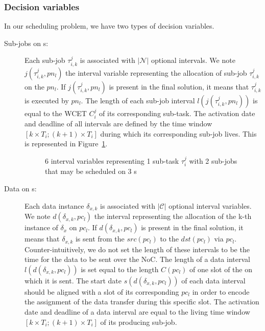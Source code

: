 \documentclass[main.tex]{subfiles}
\begin{document}
\subsubsection{Decision variables}
\label{sssec_validation_decisionVariables}
In our scheduling problem, we have two types of decision variables. 
\begin{description}
    \item[Sub-jobs on \PN{}s:] Each sub-job $\tau_{i,k}^j$ is associated with
        $|\mathcal{N}|$ optional intervals. We note $j(\tau_{i,k}^j , pn_l)$
        the interval variable representing the allocation of sub-job
        $\tau_{i,k}^j$ on the \PN{} $pn_l$. If $j(\tau_{i,k}^j , pn_l)$ is
        present in the final solution, it means that $\tau_{i,k}^j$ is executed
        by \PN{} $pn_l$. The length of each sub-job interval $l(j(\tau_{i,k}^j
        , pn_l))$ is equal to the WCET $C_i^j$ of its corresponding sub-task.
        The activation date and deadline of all intervals are defined by the
        time window $[k \times T_i ; (k+1) \times T_i ]$ during which its
        corresponding sub-job lives. This is represented in
        Figure~\ref{fig_validation_decVarJobs}.

        \begin{figure}
            \centering
            \scalebox{0.9}{}
            \caption{6 interval variables representing 1 sub-task $\tau_i^j$ with 2 sub-jobs that may be scheduled on 3 \PN{}s  }
            \label{fig_validation_decVarJobs}
        \end{figure}

    \item[Data on \PC{}s:] Each data instance $\delta_{x,k}$ is associated with
        $|\mathcal{C}|$ optional interval variables. We note $d(\delta_{x,k} ,
        pc_l)$ the interval representing the allocation of the k-th instance of
        $\delta_x$ on \PC{} $pc_l$. If $d(\delta_{x,k} , pc_l)$ is present in
        the final solution, it means that $\delta_{x,k}$ is sent from the \PN{}
        $src(pc_l)$ to the \PN{} $dst(pc_l)$ via $pc_l$. Counter-intuitively,
        we do not set the length of these intervals to be the time for the data
        to be sent over the NoC. The length of a data interval
        $l(d(\delta_{x,k} , pc_l))$ is set equal to the length $C(pc_l)$ of one
        slot of the \PC{} on which it is sent. The start date $s(d(\delta_{x,k}
        , pc_l))$ of each data interval should be aligned with a slot of its
        corresponding \PC{} $pc_l$ in order to encode the assignment of the
        data transfer during this specific slot. The activation date and
        deadline of a data interval are equal to the living time window $[k
        \times T_i ; (k+1) \times T_i ]$ of its producing sub-job.
\end{description}
\end{document}
